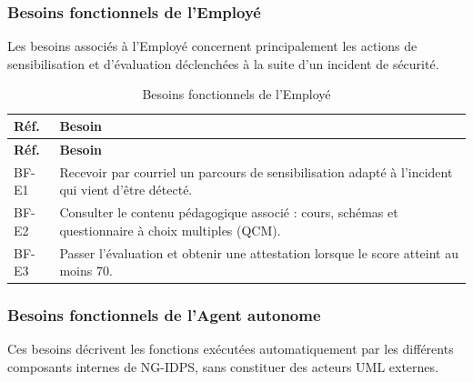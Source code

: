\subsubsection{Besoins fonctionnels de l'Employé}

Les besoins associés à l'Employé concernent principalement les actions de sensibilisation et d'évaluation déclenchées à la suite d'un incident de sécurité.


\renewcommand{\arraystretch}{1.5}
\small
\begin{xltabular}{\textwidth}{|l|>{\raggedright\arraybackslash}X|}

\caption{Besoins fonctionnels de l'Employé}
\label{tab:bf-employe} \\

\hline
{}
\textbf{Réf.} & \textbf{Besoin} \\ \hline
\endfirsthead

\hline
{}
\textbf{Réf.} & \textbf{Besoin} \\ \hline
\endhead

BF-E1 & Recevoir par courriel un parcours de sensibilisation adapté à l'incident qui vient d'être détecté. \\ \hline
BF-E2 & Consulter le contenu pédagogique associé : cours, schémas et questionnaire à choix multiples (QCM). \\ \hline
BF-E3 & Passer l'évaluation et obtenir une attestation lorsque le score atteint au moins 70. \\ \hline

\end{xltabular}

\subsubsection{Besoins fonctionnels de l'Agent autonome}

Ces besoins décrivent les fonctions exécutées automatiquement par les différents composants internes de NG-IDPS, sans constituer des acteurs UML externes.


